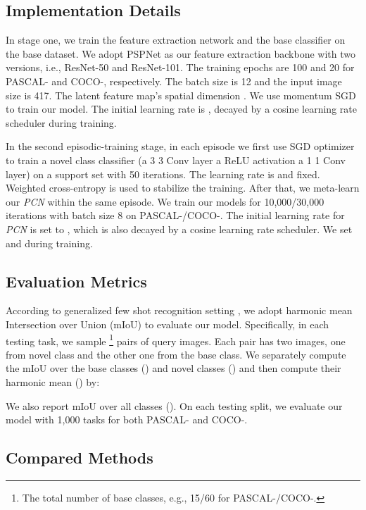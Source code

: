 \documentclass[journal]{IEEEtran}
\begin{document}
\subsection{Implementation Details} In stage one, we train the feature extraction network  and the base classifier  on the base dataset. We adopt PSPNet \cite{zhao2017pyramid} as our feature extraction backbone with two versions, i.e., ResNet-50 and ResNet-101.
The training epochs are 100 and 20 for PASCAL- and COCO-, respectively. 
The batch size is 12 and the input image size is 417. The latent feature map's spatial dimension . We use momentum SGD to train our model. 
The initial learning rate is , decayed by a cosine learning rate scheduler during training. 

In the second episodic-training stage, in each episode we first use SGD optimizer to train a novel class classifier  (a 3  3 Conv layer  a ReLU activation  a 1  1 Conv layer) on a support set with 50 iterations. 
The learning rate is   and fixed. 
Weighted cross-entropy is used to stabilize the training. 
After that, we meta-learn our \textit{PCN} within the same episode.
We train our models for 10,000/30,000 iterations with batch size 8 on PASCAL-/COCO-. The initial learning rate for \textit{PCN} is set to , which is also decayed by a cosine learning rate scheduler. 
We set  and  during training.

\subsection{Evaluation Metrics}

According to generalized few shot recognition setting \cite{gidaris2018dynamic,ye2021learning}, we adopt harmonic mean Intersection over Union (mIoU) to evaluate our model. 
Specifically, in each testing task, we sample \footnote{The total number of base classes, e.g., 15/60 for PASCAL-/COCO-.} pairs of query images. 
Each pair has two images, one from novel class and the other one from the  base class. 
We separately compute the mIoU over the base classes () and novel classes () and then compute their harmonic mean () by:

We also report mIoU over all classes ().
On each testing split, we evaluate our model with 1,000 tasks for both PASCAL- and COCO-. 

\subsection{Compared Methods}
\end{document}
